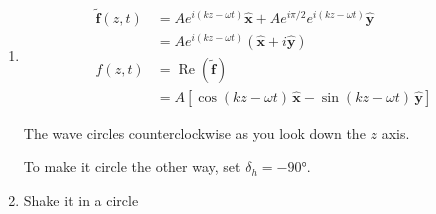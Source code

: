 \documentclass{article}
\renewcommand{\Re}{\operatorname{Re}}
\renewcommand{\vec}[1]{\boldsymbol{\mathbf{#1}}}
\newcommand{\tvec}[1]{\tilde{\vec{#1}}}
\newcommand{\uvec}[1]{\hat{\vec{#1}}}
\begin{document}
\setcounter{subsection}{7}
\subsection{}

\begin{enumerate}
  \item

        \begin{align*}
          \tvec{f}(z, t) & = A e^{i (k z - \omega t)} \uvec{x} + A e^{i \pi / 2} e^{i (k z - \omega t)} \uvec{y} \\
                         & = A e^{i (k z - \omega t)} (\uvec{x} + i \uvec{y})                                    \\
          f(z, t)        & = \Re (\tvec{f})                                                                      \\
                         & = A [\cos (k z - \omega t) \,\uvec{x} - \sin (k z - \omega t) \,\uvec{y}]
        \end{align*}

        The wave circles counterclockwise as you look down the $z$ axis.

        To make it circle the other way, set $\delta_h = \ang{-90}$.

        \setcounter{enumi}{2}
  \item Shake it in a circle
\end{enumerate}

\subsection{}
\end{document}
